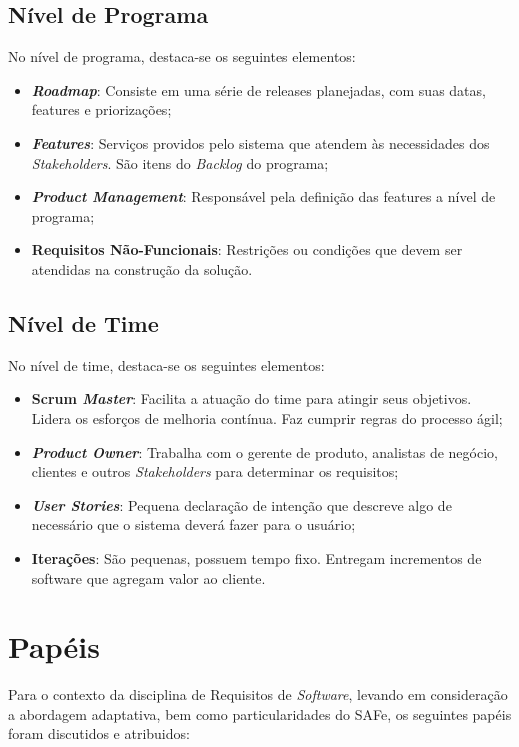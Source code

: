 		\subsection[Nível de Programa]{Nível de Programa}
		\label{subsec:processo_safe_programa}
			No nível de programa, destaca-se os seguintes elementos:
			\begin{itemize}
				\item{\textbf{\emph{Roadmap}}: Consiste em uma série de releases planejadas, com suas datas, features e priorizações;}
				\item{\textbf{\emph{Features}}: Serviços providos pelo sistema que atendem às necessidades dos \emph{Stakeholders}. São itens do \emph{Backlog} do programa;}
				\item{\textbf{\emph{Product Management}}: Responsável pela definição das features a nível de programa;}
				\item{\textbf{Requisitos Não-Funcionais}: Restrições ou condições que devem ser atendidas na construção da solução.}
			\end{itemize}

		\subsection[Nível de Time]{Nível de Time}
		\label{subsec:processo_safe_time}
			No nível de time, destaca-se os seguintes elementos:
			\begin{itemize}
				\item{\textbf{Scrum \emph{Master}}: Facilita a atuação do time para atingir seus objetivos. Lidera os esforços de melhoria contínua. Faz cumprir regras do processo ágil;}
				\item{\textbf{\emph{Product Owner}}: Trabalha com o gerente de produto, analistas de negócio, clientes e outros \emph{Stakeholders} para determinar os requisitos;}
				\item{\textbf{\emph{User Stories}}: Pequena declaração de intenção que descreve algo de necessário que o sistema deverá fazer para o usuário;}
				\item{\textbf{Iterações}: São pequenas, possuem tempo fixo. Entregam incrementos de software que agregam valor ao cliente.}
			\end{itemize}

	\section[Papéis]{Papéis}
	\label{sec:processo_papeis}
		Para o contexto da disciplina de Requisitos de \emph{Software}, levando em consideração a abordagem adaptativa, bem como particularidades do SAFe, os seguintes papéis foram discutidos e atribuidos:

